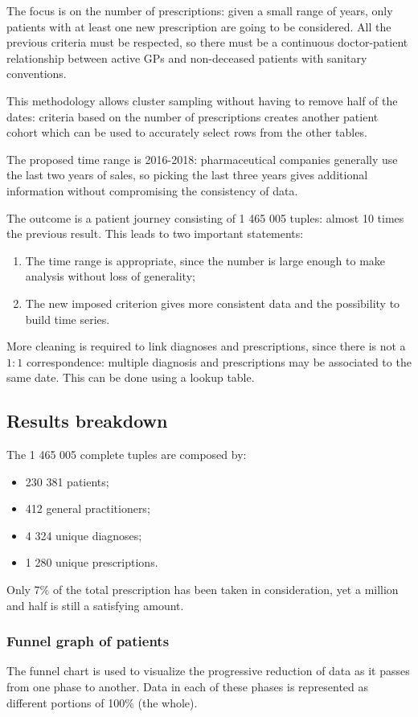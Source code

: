 The focus is on the number of prescriptions: given a small range of years, only patients with at least one new prescription are going to be considered. All the previous criteria must be respected, so there must be a continuous doctor-patient relationship between active GPs and non-deceased patients with sanitary conventions.

This methodology allows cluster sampling without having to remove half of the dates: criteria based on the number of prescriptions creates another patient cohort which can be used to accurately select rows from the other tables.

The proposed time range is 2016-2018: pharmaceutical companies generally use the last two years of sales, so picking the last three years gives additional information without compromising the consistency of data.

The outcome is a patient journey consisting of 1 465 005 tuples: almost 10 times the previous result. This leads to two important statements:
\begin{enumerate}
	\item The time range is appropriate, since the number is large enough to make analysis without loss of generality;
	\item The new imposed criterion gives more consistent data and the possibility to build time series.
\end{enumerate}

More cleaning is required to link diagnoses and prescriptions, since there is not a $1 : 1$ correspondence: multiple diagnosis and prescriptions may be associated to the same date. This can be done using a lookup table.

\subsection{Results breakdown}
The 1 465 005 complete tuples are composed by:
\begin{itemize}
	\item 230 381 patients;
	\item 412 general practitioners;
	\item 4 324 unique diagnoses;
	\item 1 280 unique prescriptions.
\end{itemize}

Only 7\% of the total prescription has been taken in consideration, yet a million and half is still a satisfying amount.

\subsubsection{Funnel graph of patients}
The funnel chart is used to visualize the progressive reduction of data as it passes from one phase to another. Data in each of these phases is represented as different portions of 100\% (the whole)\cite{funnel}.


